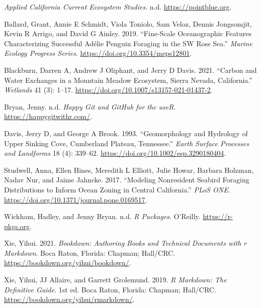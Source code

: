 \documentclass[
]{book}
\newlength{\cslhangindent}
\newlength{\cslentryspacingunit} %
\newenvironment{CSLReferences}[2] %
 {%
  \setlength{\parindent}{0pt}
  \ifodd #1
  \let\oldpar\par
  \def\par{\hangindent=\cslhangindent\oldpar}
  \fi
  \setlength{\parskip}{#2\cslentryspacingunit}
 }%
 {}
\begin{document}
\hypertarget{refs}{}
\begin{CSLReferences}{1}{0}
\leavevmode{}%
\emph{Applied California Current Ecosystem Studies}. n.d. \url{https://pointblue.org}.

\leavevmode{}%
Ballard, Grant, Annie E Schmidt, Viola Toniolo, Sam Veloz, Dennis Jongsomjit, Kevin R Arrigo, and David G Ainley. 2019. {``Fine-Scale Oceanographic Features Characterizing Successful Adélie Penguin Foraging in the SW Ross Sea.''} \emph{Marine Ecology Progress Series}. \url{https://doi.org/10.3354/meps12801}.

\leavevmode{}%
Blackburn, Darren A, Andrew J Oliphant, and Jerry D Davis. 2021. {``Carbon and Water Exchanges in a Mountain Meadow Ecosystem, Sierra Nevada, California.''} \emph{Wetlands} 41 (3): 1--17. \url{https://doi.org/10.1007/s13157-021-01437-2}.

\leavevmode{}%
Bryan, Jenny. n.d. \emph{Happy Git and GitHub for the useR}. \url{https://happygitwithr.com/}.

\leavevmode{}%
Davis, Jerry D, and George A Brook. 1993. {``Geomorphology and Hydrology of Upper Sinking Cove, Cumberland Plateau, Tennessee.''} \emph{Earth Surface Processes and Landforms} 18 (4): 339--62. \url{https://doi.org/10.1002/esp.3290180404}.

\leavevmode{}%
Studwell, Anna, Ellen Hines, Meredith L Elliott, Julie Howar, Barbara Holzman, Nadav Nur, and Jaime Jahncke. 2017. {``Modeling Nonresident Seabird Foraging Distributions to Inform Ocean Zoning in Central California.''} \emph{PLoS ONE}. \url{https://doi.org/10.1371/journal.pone.0169517}.

\leavevmode{}%
Wickham, Hadley, and Jenny Bryan. n.d. \emph{R Packages}. O'Reilly. \url{https://r-pkgs.org}.

\leavevmode{}%
Xie, Yihui. 2021. \emph{Bookdown: Authoring Books and Technical Documents with r Markdown}. Boca Raton, Florida: Chapman; Hall/CRC. \url{https://bookdown.org/yihui/bookdown/}.

\leavevmode{}%
Xie, Yihui, JJ Allaire, and Garrett Grolemund. 2019. \emph{R Markdown: The Definitive Guide}. 1st ed. Boca Raton, Florida: Chapman; Hall/CRC. \url{https://bookdown.org/yihui/rmarkdown/}.

\end{CSLReferences}

\backmatter
\printindex
\end{document}
